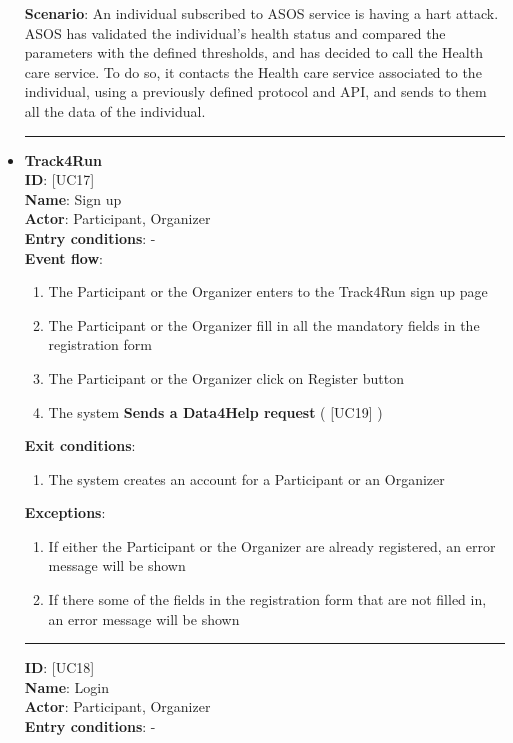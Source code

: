 \documentclass[a4paper, hidelinks, 12pt]{report}
\newcommand\usecase[1]{ [UC#1] }
\begin{document}
\begin{itemize}
		\textbf{Scenario}: An individual subscribed to ASOS service is having a hart attack. ASOS has validated the individual's health status and compared the parameters with the defined thresholds, and has decided to call the Health care service. To do so, it contacts the Health care service associated to the individual, using a previously defined protocol and API, and sends to them all the data of the individual. \\
		\rule{\linewidth}{0.4pt}
		\item{\textbf{Track4Run}}\\
		\textbf{ID}: \usecase{17} \\
		\textbf{Name}: Sign up \\
		\textbf{Actor}: Participant, Organizer \\
		\textbf{Entry conditions}: - \\
		\textbf{Event flow}:
		\begin{enumerate}
			\item{The Participant or the Organizer enters to the Track4Run sign up page}
			\item{The Participant or the Organizer fill in all the mandatory fields in the registration form}
			\item{The Participant or the Organizer click on Register button}
			\item{The system \textbf{Sends a Data4Help request} (\usecase{19})}
		\end{enumerate}
		\textbf{Exit conditions}:
		\begin{enumerate}
			\item{The system creates an account for a Participant or an Organizer}
		\end{enumerate}
		\textbf{Exceptions}:
		\begin{enumerate}
			\item{If either the Participant or the Organizer are already registered, an error message will be shown}
			\item{If there some of the fields in the registration form that are not filled in, an error message will be shown}
		\end{enumerate}
		\rule{\linewidth}{0.4pt}
		\textbf{ID}: \usecase{18} \\
		\textbf{Name}: Login \\
		\textbf{Actor}: Participant, Organizer \\
		\textbf{Entry conditions}: - \\

\end{itemize}
\end{document}
